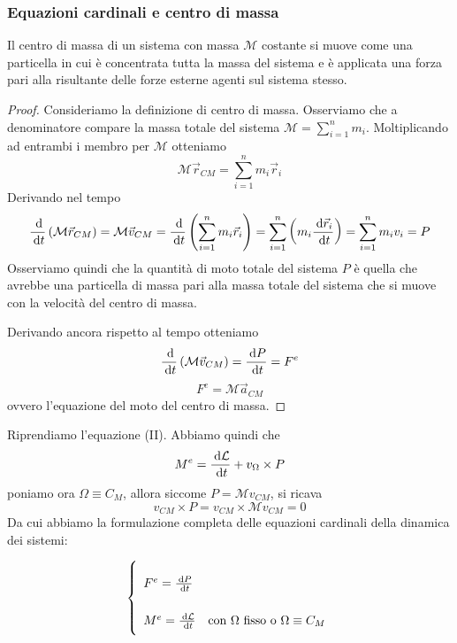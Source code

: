 \documentclass{article}
\theoremstyle{plain}
\begin{document}
\subsubsection{Equazioni cardinali e centro di massa}
\label{sss: eq cardinali e cdm}
\begin{shadedTheorem}
    Il centro di massa di un sistema con massa $\mathcal M$ costante si muove come una particella in cui è concentrata tutta la massa del sistema e è applicata una forza pari alla risultante delle forze esterne agenti sul sistema stesso.
\end{shadedTheorem}
\begin{proof}
Consideriamo la definizione di centro di massa. Osserviamo che a denominatore compare la massa totale del sistema $\mathcal{M}= \sum\limits_{i = 1}^nm_i$. Moltiplicando ad entrambi i membro per $\mathcal{M}$ otteniamo
\[\mathcal{M} \vec r_{CM} = \sum\limits_{i = 1}^nm_i\vec r_i\]
Derivando nel tempo
\[\frac{\:\text{d}}{\:\text{d} t}\left(\mathcal{M} \vec r_{CM}\right) =\mathcal{M}\vec v_{CM}
= \frac{\:\text{d}}{\:\text{d} t}\left(\sum\limits_{i = 1}^nm_i\vec r_i \right) =
 \sum\limits_{i = 1}^n\left(m_i \frac{\:\text{d} \vec r_i}{\:\text{d} t} \right) = \sum\limits_{i = 1}^nm_iv_i= P\]
Osserviamo quindi che la quantità di moto totale del sistema $P$ è quella che avrebbe una particella di massa pari alla massa totale del sistema che si muove con la velocità del centro di massa. 

Derivando ancora rispetto al tempo otteniamo 
\[\frac{\:\text{d}}{\:\text{d} t}\left( \mathcal{M}\vec v_{CM} \right) = \frac{\:\text{d} P}{\:\text{d} t} = F^e\]
\begin{equation}F^e = \mathcal{M} \vec a_{CM}\end{equation}
ovvero l'equazione del moto del centro di massa.
\end{proof}

Riprendiamo l'equazione (II). Abbiamo quindi che 
\[M^e = \frac{\:\text{d} \mathcal L}{\:\text{d} t} + v_\Omega \times P\]
poniamo ora $\Omega \equiv C_M$, allora siccome $P=\mathcal M v_{CM}$, si ricava
\[v_{CM} \times P= v_{CM} \times \mathcal M v_{CM} = 0\]
Da cui abbiamo la formulazione completa delle equazioni cardinali della dinamica dei sistemi:
\begin{shaded}
\begin{equation}
    \renewcommand{\arraystretch}{2.5}
    \left\{\begin{array}{ll} 
        F^e =\frac{\d P}{\d t}\\
        M^e = \frac{\d \mathcal{L}}{\d t} & \text{con $\Omega$ fisso o $\Omega \equiv C_M$}
     \end{array} \right.
     \label{eq: cardinali - rev}
\end{equation}
\end{shaded}
\end{document}
